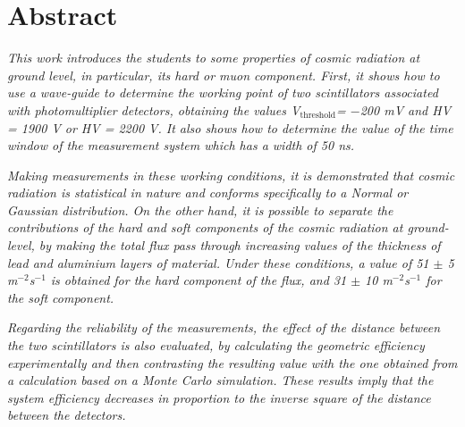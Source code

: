 	\chapter*{Abstract}

	\textit{This work introduces the students to some properties of cosmic radiation at ground level, in particular, its hard or muon component. First, it shows how to use a wave-guide to determine the working point of two scintillators associated with photomultiplier detectors, obtaining the values V$_\text{threshold}$ ​​= $-$200 mV and HV = 1900 V or HV = 2200 V. It also shows how to determine the value of the time window of the measurement system which has a width of 50 ns.}

	\textit{Making measurements in these working conditions, it is demonstrated that cosmic radiation is statistical in nature and conforms specifically to a Normal or Gaussian distribution. On the other hand, it is possible to separate the contributions of the hard and soft components of the cosmic radiation at ground-level, by making the total flux pass through increasing values of the thickness of lead and aluminium layers of material. Under these conditions, a value ​​of 51 $\pm$ 5 m$^{-2}$s$^{-1}$ is obtained for the hard component of the flux, and 31 $\pm$ 10 m$^{-2}$s$^{-1}$ for the soft component.}

	\textit{Regarding the reliability of the measurements, the effect of the distance between the two scintillators is also evaluated, by calculating the geometric efficiency experimentally and then contrasting the resulting value with the one obtained from a calculation based on a Monte Carlo simulation. These results imply that the system efficiency decreases in proportion to the inverse square of the distance between the detectors.}

